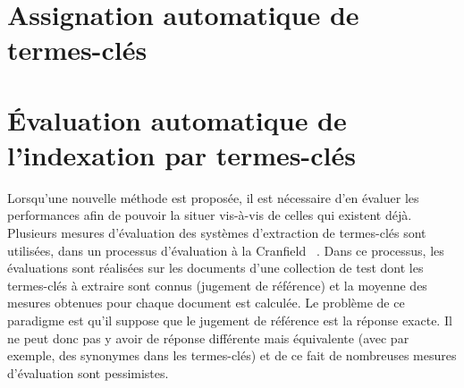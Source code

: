   \section{Assignation automatique de termes-clés}
  \label{sec:main-state_of_the_art-automatic_keyphrase_assignment}


  \section{Évaluation automatique de l'indexation par termes-clés}
  \label{sec:main-state_of_the_art-automatic_evaluation_of_keyphrase_annotation}
    Lorsqu'une nouvelle méthode est proposée, il est nécessaire d'en évaluer
    les performances afin de pouvoir la situer vis-à-vis de celles qui
    existent déjà. Plusieurs mesures d'évaluation des systèmes d'extraction de
    termes-clés sont utilisées, dans un processus d'évaluation \og à la
    Cranfield \fg \ \citep{voorhees2002philosophy}. Dans ce processus, les
    évaluations sont réalisées sur les documents d'une collection de test dont
    les termes-clés à extraire sont connus (jugement de référence) et la
    moyenne des mesures obtenues pour chaque document est calculée. Le
    problème de ce paradigme est qu'il suppose que le jugement de référence
    est la réponse exacte. Il ne peut donc pas y avoir de réponse différente
    mais équivalente (avec par exemple, des synonymes dans les termes-clés) et
    de ce fait de nombreuses mesures d'évaluation sont pessimistes.
      

